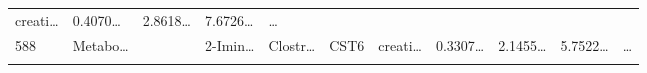 \documentclass[
]{article}
\begin{document}
\begin{longtable}[]{@{}lllllllllll@{}}
\begin{minipage}[t]{0.09\columnwidth}
creati\ldots{}\strut
\end{minipage} & \begin{minipage}[t]{0.07\columnwidth}\raggedright
0.4070\ldots{}\strut
\end{minipage} & \begin{minipage}[t]{0.07\columnwidth}\raggedright
2.8618\ldots{}\strut
\end{minipage} & \begin{minipage}[t]{0.07\columnwidth}\raggedright
7.6726\ldots{}\strut
\end{minipage} & \begin{minipage}[t]{0.03\columnwidth}\raggedright
\ldots{}\strut
\end{minipage}\tabularnewline
\begin{minipage}[t]{0.03\columnwidth}\raggedright
588\strut
\end{minipage} & \begin{minipage}[t]{0.07\columnwidth}\raggedright
Metabo\ldots{}\strut
\end{minipage} & \begin{minipage}[t]{0.07\columnwidth}\raggedright
\strut
\end{minipage} & \begin{minipage}[t]{0.09\columnwidth}\raggedright
2-Imin\ldots{}\strut
\end{minipage} & \begin{minipage}[t]{0.07\columnwidth}\raggedright
Clostr\ldots{}\strut
\end{minipage} & \begin{minipage}[t]{0.07\columnwidth}\raggedright
CST6\strut
\end{minipage} & \begin{minipage}[t]{0.09\columnwidth}\raggedright
creati\ldots{}\strut
\end{minipage} & \begin{minipage}[t]{0.07\columnwidth}\raggedright
0.3307\ldots{}\strut
\end{minipage} & \begin{minipage}[t]{0.07\columnwidth}\raggedright
2.1455\ldots{}\strut
\end{minipage} & \begin{minipage}[t]{0.07\columnwidth}\raggedright
5.7522\ldots{}\strut
\end{minipage} & \begin{minipage}[t]{0.03\columnwidth}\raggedright
\ldots{}\strut
\end{minipage}\tabularnewline
\begin{minipage}[t]{0.03\columnwidth}\raggedright

\end{minipage}
\end{longtable}
\end{document}
